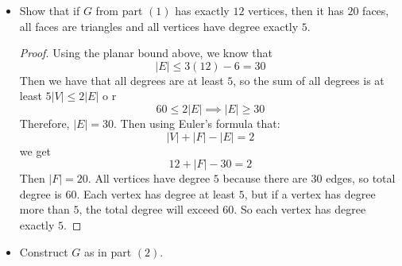 \documentclass{article}
\begin{document}
\begin{itemize}
        \item Show that if $G$ from part $(1)$ has exactly $12$ vertices, then it has $20$ faces, all faces are triangles and all vertices have degree exactly $5$.
            \begin{proof}
                Using the planar bound above, we know that
                    \begin{equation*}
                        \lvert E \rvert \leq 3(12) - 6 = 30
                    \end{equation*}
                Then we have that all degrees are at least $5$, so the sum of all degrees is at least $5\lvert V \rvert \leq 2\lvert E \rvert$ o r
                    \begin{equation*}
                         60 \leq 2\lvert E \rvert \implies \lvert E \rvert \geq 30
                    \end{equation*}
                Therefore, $\lvert E \rvert = 30$. Then using Euler's formula that:
                    \begin{equation*}
                        \lvert V \rvert + \lvert F \rvert - \lvert E \rvert = 2
                    \end{equation*}
                we get
                    \begin{equation*}
                        12 + \lvert F \rvert - 30 = 2
                    \end{equation*}
                Then $\lvert F \rvert = 20$. All vertices have degree $5$ because there are $30$ edges, so total degree is $60$. Each vertex has degree at least $5$, but if a vertex has degree more than $5$, the total degree will exceed $60$. So each vertex has degree exactly $5$.
            \end{proof}

        \item Construct $G$ as in part $(2)$. 
            \begin{answer}
                \begin{fixedfigure}
                \end{fixedfigure}
            \end{answer}
    \end{itemize}
\end{document}
